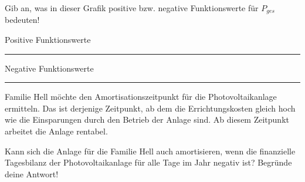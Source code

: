 \begin{langesbeispiel}
\begin{enumerate}
Gib an, was in dieser Grafik positive bzw. negative Funktionswerte für $P_{ges}$ bedeuten!

Positive Funktionswerte \rule{8cm}{0.3pt}\leer

Negative Funktionswerte \rule{8cm}{0.3pt}

Familie Hell möchte den Amortisationszeitpunkt für die Photovoltaikanlage ermitteln. Das ist derjenige Zeitpunkt, ab dem die Errichtungskosten gleich hoch wie die Einsparungen durch den Betrieb der Anlage sind. Ab diesem Zeitpunkt arbeitet die Anlage rentabel.

Kann sich die Anlage für die Familie Hell auch amortisieren, wenn die finanzielle Tagesbilanz der Photovoltaikanlage für alle Tage im Jahr negativ ist? Begründe deine Antwort!
				\end{enumerate}\leer
				
				
\end{langesbeispiel}